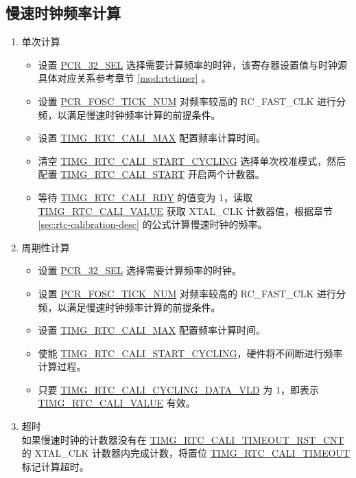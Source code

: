 \documentclass[main\_\_CN.tex]{subfiles}
\begin{document}
\subsection{慢速时钟频率计算}
\label{sec:rtc-calibration-procedure}

\begin{enumerate}
    \item 单次计算
    \begin{itemize}
        \item 设置 \hyperref[fielddesc:PCR32KSEL]{PCR\_32\_SEL} 选择需要计算频率的时钟，该寄存器设置值与时钟源具体对应关系参考章节 \ref{mod:rtctimer} \textit{}。

        \item 设置 \hyperref[fielddesc:PCRFOSCTICKNUM]{PCR\_FOSC\_TICK\_NUM} 对频率较高的 RC\_FAST\_CLK 进行分频，以满足慢速时钟频率计算的前提条件。

        \item 设置 \hyperref[fielddesc:TIMGRTCCALIMAX]{TIMG\_RTC\_CALI\_MAX} 配置频率计算时间。

        \item 清空 \hyperref[fielddesc:TIMGRTCCALISTARTCYCLING]{TIMG\_RTC\_CALI\_START\_CYCLING} 选择单次校准模式，然后配置 \hyperref[fielddesc:TIMGRTCCALISTART]{TIMG\_RTC\_CALI\_START} 开启两个计数器。

        \item 等待  \hyperref[fielddesc:TIMGRTCCALIRDY]{TIMG\_RTC\_CALI\_RDY} 的值变为 1，读取 \hyperref[fielddesc:TIMGRTCCALIVALUE]{TIMG\_RTC\_CALI\_VALUE} 获取 XTAL\_CLK 计数器值，根据章节 \ref{sec:rtc-calibration-desc} 的公式计算慢速时钟的频率。
    \end{itemize}
    \item 周期性计算
    \begin{itemize}
        \item 设置 \hyperref[fielddesc:PCR32KSEL]{PCR\_32\_SEL} 选择需要计算频率的时钟。

        \item 设置 \hyperref[fielddesc:PCRFOSCTICKNUM]{PCR\_FOSC\_TICK\_NUM} 对频率较高的 RC\_FAST\_CLK 进行分频，以满足慢速时钟频率计算的前提条件。

        \item 设置 \hyperref[fielddesc:TIMGRTCCALIMAX]{TIMG\_RTC\_CALI\_MAX} 配置频率计算时间。

        \item 使能 \hyperref[fielddesc:TIMGRTCCALISTARTCYCLING]{TIMG\_RTC\_CALI\_START\_CYCLING}，硬件将不间断进行频率计算过程。

        \item 只要 \hyperref[fielddesc:TIMGRTCCALICYCLINGDATAVLD]{TIMG\_RTC\_CALI\_CYCLING\_DATA\_VLD} 为 1，即表示 \hyperref[fielddesc:TIMGRTCCALIVALUE]{TIMG\_RTC\_CALI\_VALUE} 有效。
    \end{itemize}
    \item 超时\\
    如果慢速时钟的计数器没有在 \hyperref[fielddesc:TIMGRTCCALITIMEOUTRSTCNT]{TIMG\_RTC\_CALI\_TIMEOUT\_RST\_CNT} 的 XTAL\_CLK 计数器内完成计数，将置位 \hyperref[fielddesc:TIMGRTCCALITIMEOUT]{TIMG\_RTC\_CALI\_TIMEOUT} 标记计算超时。
\end{enumerate}
\end{document}
